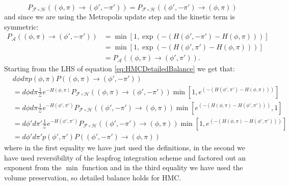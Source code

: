 \documentclass[12pt]{article}
\begin{document}
            \begin{equation}
                P_{\mathcal{F}\circ \mathcal{H}}\left(\left(\phi,\pi\right) \rightarrow \left(\phi',-\pi'\right)\right) =  P_{\mathcal{F}\circ \mathcal{H}}\left(\left(\phi',-\pi'\right) \rightarrow \left(\phi,\pi\right)\right)
            \end{equation}
            and since we are using the Metropolis update step and the kinetic term is symmetric:
            \begin{align}
                P_{\mathcal{A}}\left(\left(\phi,\pi\right)\rightarrow \left(\phi',-\pi'\right)\right) & = \min\left[1,\exp\left(-\left(H\left(\phi',-\pi'\right)-H\left(\phi,\pi\right)\right)\right)\right] \\
                & = \min\left[1,\exp\left(-\left(H\left(\phi',\pi'\right)-H\left(\phi,\pi\right)\right)\right)\right] \\
                & = P_{\mathcal{A}}\left(\left(\phi,\pi\right)\rightarrow \left(\phi',\pi'\right)\right).
            \end{align}
            Starting from the LHS of equation \ref{eq:HMCDetailedBalance} we get that:
            \begin{align}
                & d\phi d\pi p\left(\phi,\pi\right) P\left(\left(\phi,\pi\right)\rightarrow\left(\phi',-\pi'\right)\right) \\
                 & = d\phi d\pi \frac{1}{\mathcal{Z}}e^{-H\left(\phi,\pi\right)}P_{\mathcal{F}\circ \mathcal{H}}\left(\left(\phi,\pi\right) \rightarrow \left(\phi',-\pi'\right)\right)\min{\left[1,e^{\left(-\left(H\left(\phi',\pi'\right)-H\left(\phi,\pi\right)\right)\right)}\right]}\\ 
                 & = d\phi d\pi \frac{1}{\mathcal{Z}}e^{-H\left(\phi',\pi'\right)}P_{\mathcal{F} \circ \mathcal{H}}\left(\left(\phi',-\pi'\right) \rightarrow \left(\phi,\pi\right)\right)\min{\left[e^{\left(-\left(H\left(\phi,\pi\right)-H\left(\phi',\pi'\right)\right)\right)},1\right]}\\
                 & = d\phi' d\pi' \frac{1}{\mathcal{Z}}e^{-H\left(\phi',\pi'\right)}P_{\mathcal{F} \circ \mathcal{H}}\left(\left(\phi',-\pi'\right) \rightarrow \left(\phi,\pi\right)\right)\min\left[1,e^{\left(-\left(H\left(\phi,\pi\right)-H\left(\phi',\pi'\right)\right)\right)}\right]\\
                 & = d\phi' d\pi' p\left(\phi',\pi'\right) P\left(\left(\phi',-\pi'\right)\rightarrow\left(\phi,\pi\right)\right)
            \end{align}
            where in the first equality we have just used the definitions, in the second we have used reversibility of the leapfrog integration scheme and factored out an exponent from the $\min$ function and in the third equality we have used the volume preservation, so detailed balance holds for HMC.
\end{document}
